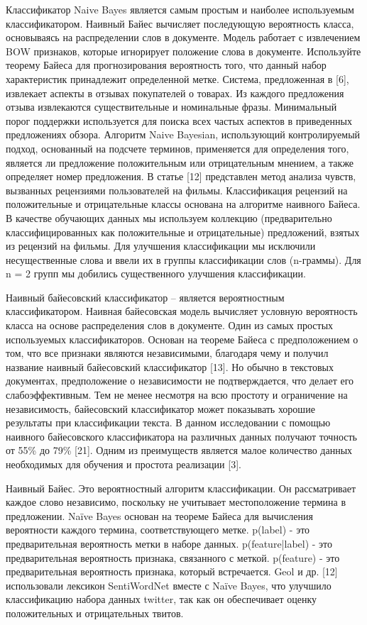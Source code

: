 Классификатор Naive Bayes является самым простым и наиболее используемым
классификатором. Наивный Байес вычисляет последующую вероятность класса,
основываясь на распределении слов в документе. Модель работает с извлечением BOW
признаков, которые игнорирует положение слова в документе. Используйте теорему
Байеса для прогнозирования вероятность того, что данный набор характеристик
принадлежит определенной метке.
Система, предложенная в [6], извлекает аспекты в отзывах покупателей о товарах.
Из каждого предложения отзыва извлекаются существительные и номинальные фразы.
Минимальный порог поддержки используется для поиска всех частых аспектов в
приведенных предложениях обзора. Алгоритм Naive Bayesian, использующий
контролируемый подход, основанный на подсчете терминов, применяется для
определения того, является ли предложение положительным или отрицательным
мнением, а также определяет номер предложения. В статье [12] представлен метод
анализа чувств, вызванных рецензиями пользователей на фильмы. Классификация
рецензий на положительные и отрицательные классы основана на алгоритме наивного
Байеса. В качестве обучающих данных мы используем коллекцию (предварительно
классифицированных как положительные и отрицательные) предложений, взятых из
рецензий на фильмы. Для улучшения классификации мы исключили несущественные
слова и ввели их в группы классификации слов (n-граммы). Для n = 2 групп мы
добились существенного улучшения классификации.~\cite{article4}

Наивный байесовский классификатор – является вероятностным классификатором.
Наивная байесовская модель вычисляет условную вероятность класса на основе
распределения слов в документе. Один из самых простых используемых
классификаторов. Основан на теореме Байеса с предположением о том, что все
признаки являются независимыми, благодаря чему и получил название наивный
байесовский классификатор [13]. Но обычно в текстовых документах, предположение
о независимости не подтверждается, что делает его слабоэффективным. Тем не менее
несмотря на всю простоту и ограничение на независимость, байесовский
классификатор может показывать хорошие результаты при классификации текста. В
данном исследовании с помощью наивного байесовского классификатора на различных
данных получают точность от 55\% до 79\% [21]. Одним из преимуществ является
малое количество данных необходимых для обучения и простота реализации [3].
\cite{article9}

Наивный Байес. Это вероятностный алгоритм классификации. Он рассматривает каждое
слово независимо, поскольку не учитывает местоположение термина в предложении.
Naïve Bayes основан на теореме Байеса для вычисления вероятности каждого
термина, соответствующего метке. 
p(label) - это предварительная вероятность
метки в наборе данных. p(feature|label) - это предварительная вероятность
признака, связанного с меткой. p(feature) - это предварительная вероятность
признака, который встречается. Geol и др. [12] использовали лексикон
SentiWordNet вместе с Naïve Bayes, что улучшило классификацию набора данных
twitter, так как он обеспечивает оценку положительных и отрицательных твитов.
\cite{article16}

